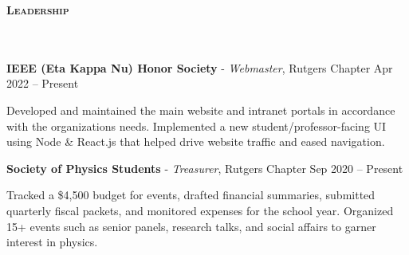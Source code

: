 \documentclass{article}
\newcommand{\header}[1]{{
\hspace*{0pt}\vspace*{6pt} \textsc{#1}} \vspace*{-6pt} 
\lineunder
}
\newcommand{\lineunder}{
\vspace*{-8pt} \\ \hspace*{-3pt} 
\hrulefill \\
}
\newcommand{\employer}[4]{{
\vspace*{2pt}%
\textbf{#1} #2 \hfill #3\\ #4 \vspace*{2pt}}
}
\renewcommand{\labelitemii}{
$\vcenter{\hbox{\tiny$\bullet$}}$\hspace*{-3pt}
}
\newenvironment{bullet-list-minor}{
\begin{list}{\labelitemii}{\setlength\leftmargin{15pt} 
\topsep 0pt \itemsep -2pt}}{\vspace*{4pt}\end{list}
}
\begin{document}
\vspace*{4pt}%
\header{\textbf{Leadership}}
    \employer{IEEE (Eta Kappa Nu) Honor Society}
    {- \emph{Webmaster}, Rutgers Chapter}{Apr 2022 -- Present}{}
    \begin{bullet-list-minor}
    \item Developed and maintained the main website and intranet portals in accordance with the organizations needs. Implemented a new student/professor-facing UI using Node \& React.js that helped drive website traffic and eased navigation.
    \end{bullet-list-minor}
    \employer{Society of Physics Students}
    {- \emph{Treasurer}, Rutgers Chapter}{Sep 2020 -- Present}{}
	\begin{bullet-list-minor}
    \item Tracked a \$4,500 budget for events, drafted financial summaries, submitted quarterly fiscal packets, and monitored expenses for the school year. Organized 15+ events such as senior panels, research talks, and social affairs to garner interest in physics.
    \end{bullet-list-minor}
\end{document}
